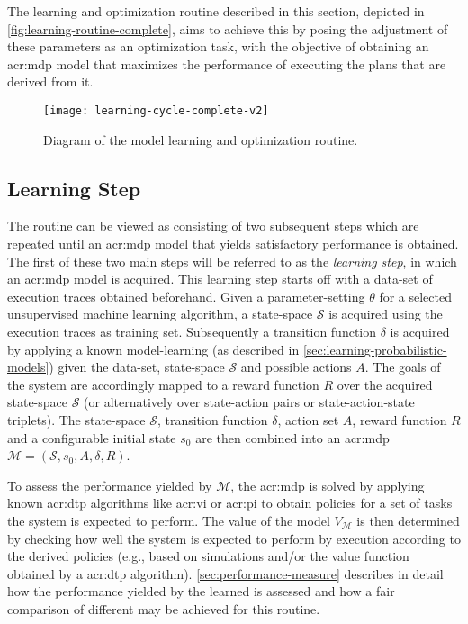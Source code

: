 The learning and optimization routine described in this section, depicted in \autoref{fig:learning-routine-complete}, aims to achieve this by posing the adjustment of these parameters as an optimization task, with the objective of obtaining an \acrshort{acr:mdp} model that maximizes the performance of executing the plans that are derived from it.

\begin{figure}[t]
	\centering
	\texttt{[image: learning-cycle-complete-v2]}
	\caption{Diagram of the model learning and optimization routine.}
	\label{fig:learning-routine-complete}
\end{figure}

\subsection{Learning Step}
\label{sec:routine-description}

The routine can be viewed as consisting of two subsequent steps which are repeated until an \acrshort{acr:mdp} model that yields satisfactory performance is obtained.
The first of these two main steps will be referred to as the \textit{learning step}, in which an \acrshort{acr:mdp} model is acquired.
This learning step starts off with a data-set of execution traces obtained beforehand.
Given a parameter-setting $\theta$ for a selected unsupervised machine learning algorithm, a state-space $\mathcal{S}$ is acquired using the execution traces as training set.
Subsequently a transition function $\delta$ is acquired by applying a known model-learning (as described in \autoref{sec:learning-probabilistic-models}) given the data-set, state-space $\mathcal{S}$ and possible actions $A$.
The goals of the system are accordingly mapped to a reward function $R$ over the acquired state-space $\mathcal{S}$ (or alternatively over state-action pairs or state-action-state triplets).
The state-space $\mathcal{S}$, transition function $\delta$, action set $A$, reward function $R$ and a configurable initial state $s_0$ are then combined into an \acrshort{acr:mdp} $\mathcal{M} = (\mathcal{S}, s_0, A, \delta, R)$.

To assess the performance yielded by $\mathcal{M}$, the \acrshort{acr:mdp} is solved by applying known \acrshort{acr:dtp} algorithms like \acrshort{acr:vi} or \acrshort{acr:pi} to obtain policies for a set of tasks the system is expected to perform.
The value of the model $V_{\mathcal{M}}$ is then determined by checking how well the system is expected to perform by execution according to the derived policies (e.g., based on simulations and/or the value function obtained by a \acrshort{acr:dtp} algorithm).
\autoref{sec:performance-measure} describes in detail how the performance yielded by the learned  is assessed and how a fair comparison of different  may be achieved for this routine.

